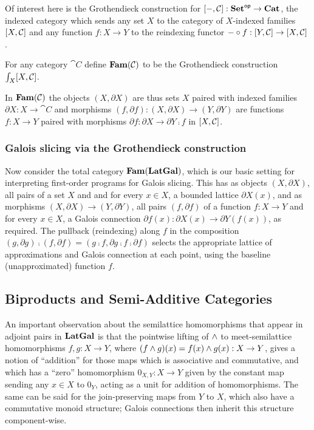 Of interest here is the Grothendieck construction for $[-,\mathcal{C}]: \mathbf{Set}^{\mathsf{op}} \to \mathbf{Cat}$, the indexed
category which sends any set $X$ to the category of $X$-indexed families $[X,\mathcal{C}]$ and any function
$f: X \to Y$ to the reindexing functor $- \circ f: [Y,\mathcal{C}] \to [X,\mathcal{C}]$ .

\begin{definition}
For any category $\cat{C}$ define $\mathbf{Fam}(\mathcal{C})$ to be the Grothendieck construction
$\int_{X}[X,\mathcal{C}]$.
\end{definition}

\noindent In $\mathbf{Fam}(\mathcal{C})$ the objects $(X, \partial X)$ are thus sets $X$ paired with indexed families
$\partial X: X \to \cat{C}$ and morphisms $(f, \partial f): (X, \partial X) \to (Y, \partial Y)$ are functions
$f: X \to Y$ paired with morphisms $\partial f: \partial X \to \partial Y \comp f$ in $[X,\mathcal{C}]$.

\subsubsection{Galois slicing via the Grothendieck construction}

Now consider the total category $\mathbf{Fam}(\mathbf{LatGal})$, which is our basic setting for interpreting first-order
programs for Galois slicing. This has as objects $(X, \partial X)$, all pairs of a set $X$ and and for every
$x \in X$, a bounded lattice $\partial X(x)$, and as morphisms $(X, \partial X) \to (Y, \partial Y)$, all
pairs $(f, \partial f)$ of a function $f: X \to Y$ and for every $x \in X$, a Galois connection $\partial
f(x): \partial X(x) \to \partial Y(f(x))$, as required. The pullback (reindexing) along $f$ in the composition
$(g, \partial g) \comp (f, \partial f) = (g \comp f, \partial g \comp f \comp \partial f)$ selects the
appropriate lattice of approximations and Galois connection at each point, using the baseline (unapproximated)
function $f$.

\subsection{Biproducts and Semi-Additive Categories}

An important observation about the semilattice homomorphisms that appear in adjoint pairs in $\mathbf{LatGal}$ is that
the pointwise lifting of $\wedge$ to meet-semilattice homomorphisms $f, g: X \to Y$, where $(f \wedge g)(x) =
f(x) \wedge g(x): X \to Y$, gives a notion of ``addition'' for those maps which is associative and commutative,
and which has a ``zero'' homomorphism $0_{X,Y}: X \to Y$ given by the constant map sending any $x \in X$ to
$0_Y$, acting as a unit for addition of homomorphisms. The same can be said for the join-preserving maps from
$Y$ to $X$, which also have a commutative monoid structure; Galois connections then inherit this structure
component-wise.

